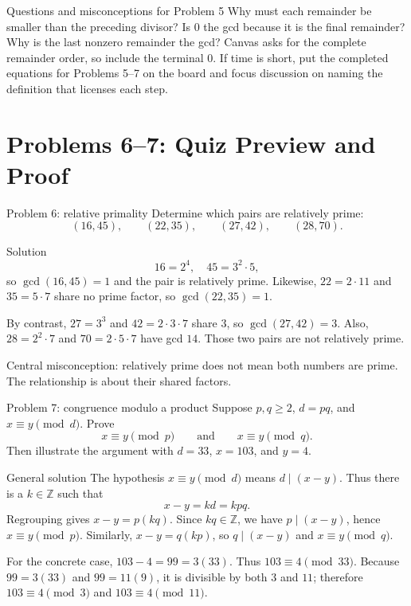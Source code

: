 \documentclass[10pt]{article}
\newcommand{\Z}{\mathbb Z}
\begin{document}
\begin{promptbox}{Questions and misconceptions for Problem 5}
Why must each remainder be smaller than the preceding divisor? Is $0$ the gcd
because it is the final remainder? Why is the last nonzero remainder the gcd?
Canvas asks for the complete remainder order, so include the terminal $0$.
If time is short, put the completed equations for Problems 5--7 on the board
and focus discussion on naming the definition that licenses each step.
\end{promptbox}

\thispagestyle{fancy}
\clearpage
\pagestyle{fancy}
\thispagestyle{fancy}
\section*{Problems 6--7: Quiz Preview and Proof}
\thispagestyle{fancy}

\begin{promptbox}{Problem 6: relative primality}
Determine which pairs are relatively prime:
\[
(16,45),\qquad(22,35),\qquad(27,42),\qquad(28,70).
\]
\end{promptbox}

\begin{solutionbox}{Solution}
\[
16=2^4,\quad45=3^2\cdot5,
\]
so $\gcd(16,45)=1$ and the pair is relatively prime. Likewise,
$22=2\cdot11$ and $35=5\cdot7$ share no prime factor, so
$\gcd(22,35)=1$.

By contrast, $27=3^3$ and $42=2\cdot3\cdot7$ share $3$, so
$\gcd(27,42)=3$. Also, $28=2^2\cdot7$ and $70=2\cdot5\cdot7$ have gcd
$14$. Those two pairs are not relatively prime.

Central misconception: relatively prime does not mean both numbers are prime.
The relationship is about their shared factors.
\end{solutionbox}

\begin{promptbox}{Problem 7: congruence modulo a product}
Suppose $p,q\ge2$, $d=pq$, and $x\equiv y\pmod d$. Prove
\[
x\equiv y\pmod p\qquad\text{and}\qquad x\equiv y\pmod q.
\]
Then illustrate the argument with $d=33$, $x=103$, and $y=4$.
\end{promptbox}

\begin{solutionbox}{General solution}
The hypothesis $x\equiv y\pmod d$ means $d\mid(x-y)$. Thus there is a
$k\in\Z$ such that
\[
x-y=kd=kpq.
\]
Regrouping gives $x-y=p(kq)$. Since $kq\in\Z$, we have $p\mid(x-y)$, hence
$x\equiv y\pmod p$. Similarly, $x-y=q(kp)$, so $q\mid(x-y)$ and
$x\equiv y\pmod q$.

For the concrete case, $103-4=99=3(33)$. Thus $103\equiv4\pmod{33}$.
Because $99=3(33)$ and $99=11(9)$, it is divisible by both $3$ and $11$;
therefore $103\equiv4\pmod3$ and $103\equiv4\pmod{11}$.
\end{solutionbox}
\end{document}
